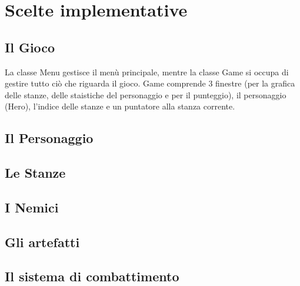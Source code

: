 \documentclass[12pt]{article}
\begin{document}
\newpage
\section*{Scelte implementative}
\subsection*{Il Gioco}
La classe Menu gestisce il menù principale, mentre la classe Game si occupa di gestire tutto ciò che riguarda il gioco.
Game comprende 3 finestre (per la grafica delle stanze, delle staistiche del personaggio e per il punteggio), il personaggio (Hero), l'indice delle stanze e un puntatore alla stanza corrente.

\subsection*{Il Personaggio}
\subsection*{Le Stanze}
\subsection*{I Nemici}
\subsection*{Gli artefatti}
\subsection*{Il sistema di combattimento}
\end{document}
